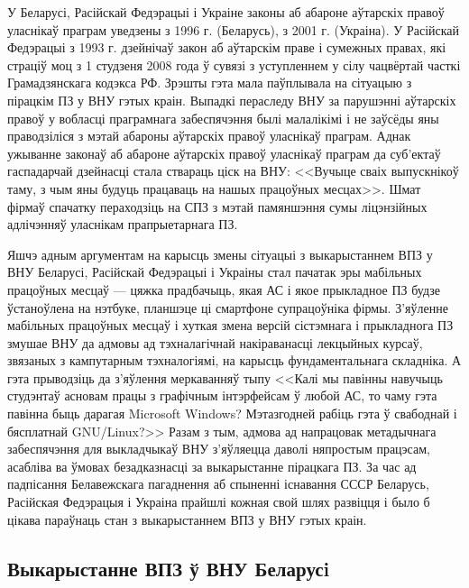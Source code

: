 \documentclass[10pt, a5paper]{article}
\begin{document}
У Беларусі, Расійскай Федэрацыі і Украіне законы аб абароне аўтарскіх правоў
уласнікаў праграм уведзены з 1996 г. (Беларусь), з 2001 г. (Украіна). У Расійскай
Федэрацыі з 1993 г. дзейнічаў закон аб аўтарскім праве і сумежных правах, які
страціў моц з 1 студзеня 2008 года ў сувязі з уступленнем у сілу чацвёртай часткі
Грамадзянскага кодэкса РФ. Зрэшты гэта мала паўплывала на сітуацыю з пірацкім
ПЗ у ВНУ гэтых краін. Выпадкі пераследу ВНУ за парушэнні аўтарскіх правоў у
вобласці праграмнага забеспячэння былі малалікімі і не заўсёды яны праводзіліся
з мэтай абароны аўтарскіх правоў уласнікаў праграм. Аднак ужыванне законаў аб
абароне аўтарскіх правоў уласнікаў праграм да суб'ектаў гаспадарчай дзейнасці
стала ствараць ціск на ВНУ: <<Вучыце сваіх выпускнікоў таму, з чым яны будуць
працаваць на нашых працоўных месцах>>. Шмат фірмаў спачатку пераходзіць на СПЗ
з мэтай памяншэння сумы ліцэнзійных адлічэнняў уласнікам прапрыетарнага ПЗ.

Яшчэ адным аргументам на карысць змены сітуацыі з выкарыстаннем ВПЗ у ВНУ
Беларусі, Расійскай Федэрацыі і Украіны стал пачатак эры мабільных працоўных
месцаў --- цяжка прадбачыць, якая АС і якое прыкладное ПЗ будзе ўстаноўлена
на нэтбуке, планшэце ці смартфоне супрацоўніка фірмы. З'яўленне мабільных
працоўных месцаў і хуткая змена версій сістэмнага і прыкладнога ПЗ змушае
ВНУ да адмовы ад тэхналагічнай накіраванасці лекцыйных курсаў, звязаных
з кампутарным тэхналогіямі, на карысць фундаментальнага складніка. А гэта
прыводзіць да з'яўлення меркаванняў тыпу <<Калі мы павінны навучыць студэнтаў
асновам працы з графічным інтэрфейсам ў любой АС, то чаму гэта павінна быць
дарагая Microsoft Windows? Мэтазгодней рабіць гэта ў свабоднай і бясплатнай GNU/Linux?>>
Разам з тым, адмова ад напрацовак метадычнага забеспячэння для выкладчыкаў
ВНУ з'яўляецца даволі няпростым працэсам, асабліва ва ўмовах безадказнасці
за выкарыстанне пірацкага ПЗ. За час ад падпісання Белавежскага пагаднення
аб спыненні існавання СССР Беларусь, Расійская Федэрацыя і Украіна прайшлі
кожная свой шлях развіцця і было б цікава параўнаць стан з выкарыстаннем ВПЗ
у ВНУ гэтых краін.

\subsection*{Выкарыстанне ВПЗ ў ВНУ Беларусi}
\end{document}
